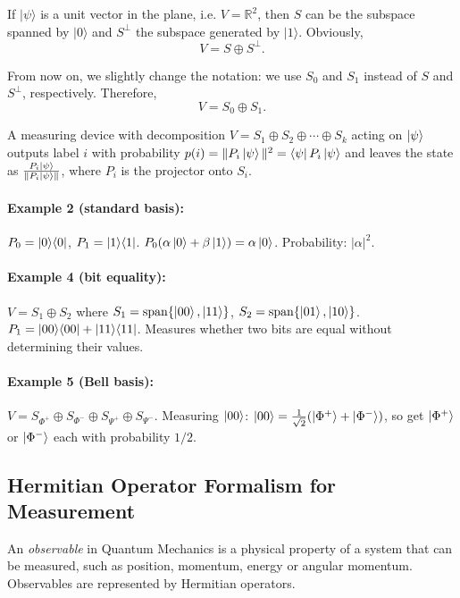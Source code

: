 \documentclass[10pt,a4paper]{article}
\begin{document}
If \(|\psi\rangle\) is a unit vector in the plane, i.e. \(V=\mathbb{R}^2\), then \(S\) can be the subspace spanned by \(|0\rangle\) and \(S^\perp\) the subspace generated by \(|1\rangle\). Obviously,
\[
V = S \oplus S^\perp .
\]

From now on, we slightly change the notation: we use \(S_0\) and \(S_1\) instead of \(S\) and \(S^\perp\), respectively. Therefore,
\[
V = S_0 \oplus S_1 .
\]

\begin{tcolorbox}[propstyle, title={Postulate}]
A measuring device with decomposition $V=S_1\oplus S_2\oplus\cdots\oplus S_k$ acting on $\ket{\psi}$ outputs label $i$ with probability $p(i)=\|P_i\ket{\psi}\|^2=\bra{\psi}P_i\ket{\psi}$ and leaves the state as $\frac{P_i\ket{\psi}}{\|P_i\ket{\psi}\|}$, where $P_i$ is the projector onto $S_i$.
\end{tcolorbox}

\paragraph{Example 2 (standard basis):} $P_0=\ket{0}\!\bra{0}$, $P_1=\ket{1}\!\bra{1}$. $P_0(\alpha\ket{0}+\beta\ket{1})=\alpha\ket{0}$. Probability: $|\alpha|^2$.

\paragraph{Example 4 (bit equality):} $V=S_1\oplus S_2$ where $S_1=\mathrm{span}\{\ket{00},\ket{11}\}$, $S_2=\mathrm{span}\{\ket{01},\ket{10}\}$. $P_1=\ket{00}\!\bra{00}+\ket{11}\!\bra{11}$. Measures whether two bits are equal without determining their values.

\paragraph{Example 5 (Bell basis):} $V=S_{\Phi^+}\oplus S_{\Phi^-}\oplus S_{\Psi^+}\oplus S_{\Psi^-}$. Measuring $\ket{00}$: $\ket{00}=\frac{1}{\sqrt{2}}(\ket{\Phi^+}+\ket{\Phi^-})$, so get $\ket{\Phi^+}$ or $\ket{\Phi^-}$ each with probability $1/2$.



\subsection{Hermitian Operator Formalism for Measurement}
An \textit{observable} in Quantum Mechanics is a physical property of a system that can be measured, such as position, momentum, energy or angular momentum.
Observables are represented by Hermitian operators.
\end{document}
